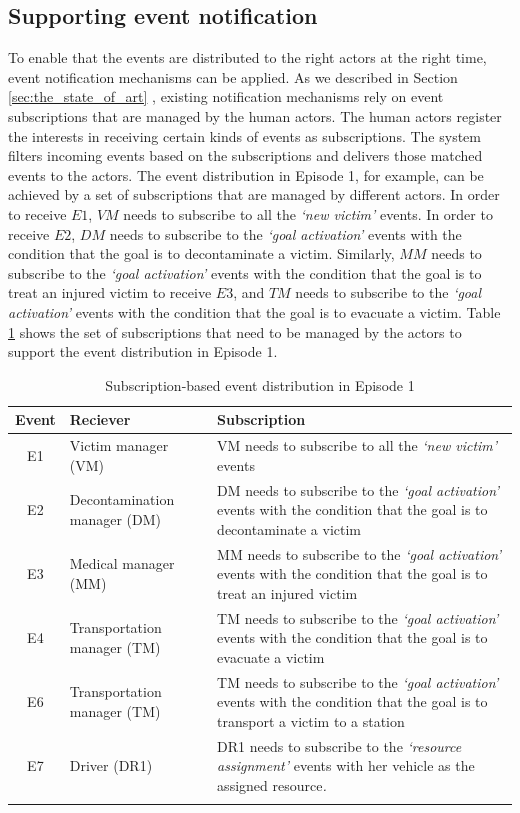\subsection{Supporting event notification} %
\label{sub:supporting_event_notification}
To enable that the events are distributed to the right actors at the right time, event notification mechanisms can be applied. As we described in Section \ref{sec:the_state_of_art}  , existing notification mechanisms rely on event subscriptions that are managed by the human actors. The human actors register the interests in receiving certain kinds of events as subscriptions. The system filters incoming events based on the subscriptions and delivers those matched events to the actors. The event distribution in Episode 1, for example, can be achieved by a set of subscriptions that are managed by different actors. In order to receive $E1$, $VM$ needs to subscribe to all the \emph{`new victim'} events. In order to receive $E2$, $DM$ needs to subscribe to the \emph{`goal activation'} events with the condition that the goal is to decontaminate a victim. Similarly, $MM$ needs to subscribe to the \emph{`goal activation'} events with the condition that the goal is to treat an injured victim to receive $E3$, and $TM$ needs to subscribe to the \emph{`goal activation'} events with the condition that the goal is to evacuate a victim. Table \ref{tab:episode_1_subscriptions} shows the set of subscriptions that need to be managed by the actors to support the event distribution in Episode 1.

{\footnotesize
	\begin{longtable}{c>{\raggedright}p{2in}>{\raggedright}p{2.5in}}
\toprule 
\textbf{Event} & \textbf{Reciever} & \textbf{Subscription}\tabularnewline
\midrule 
E1  & Victim manager (VM) & VM needs to subscribe to all the \emph{`new victim'} events\tabularnewline
\midrule 
E2 & Decontamination manager (DM) & DM needs to subscribe to the \emph{`goal activation'} events with
the condition that the goal is to decontaminate a victim\tabularnewline
\midrule 
E3 & Medical manager (MM) & MM needs to subscribe to the \emph{`goal activation'} events with
the condition that the goal is to treat an injured victim\tabularnewline
\midrule 
E4 & Transportation manager (TM) & TM needs to subscribe to the \emph{`goal activation'} events with
the condition that the goal is to evacuate a victim\tabularnewline
\midrule 
E6 & Transportation manager (TM) & TM needs to subscribe to the \emph{`goal activation'} events with
the condition that the goal is to transport a victim to a station\tabularnewline
\midrule 
E7 & Driver (DR1) & DR1 needs to subscribe to the \emph{`resource assignment' }events
with her vehicle as the assigned resource\emph{.}\tabularnewline
\bottomrule
\caption{Subscription-based event distribution in Episode 1}
\label{tab:episode_1_subscriptions}

\end{longtable}
}

